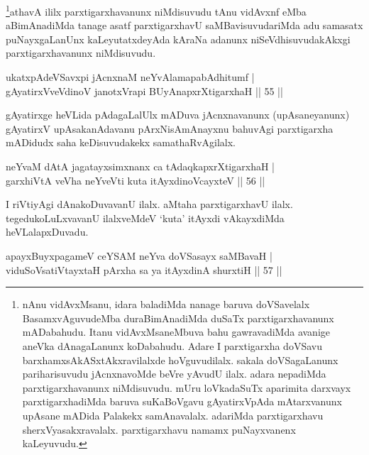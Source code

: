 \begin{artha} 
\footnote[1]{nAnu vidAvxMsanu, idara baladiMda nanage baruva 
doVSavelalx BasamxvAguvudeMba duraBimAnadiMda duSaTx 
parxtigarxhavanunx mADabahudu. Itanu vidAvxMsaneMbuva bahu 
gawravadiMda avanige aneVka dAnagaLanunx koDabahudu. Adare I 
parxtigarxha doVSavu barxhamxsAkASxtAkxravilalxde hoVguvudilalx. 
sakala doVSagaLanunx pariharisuvudu jAcnxnavoMde beVre yAvudU ilalx. 
adara nepadiMda parxtigarxhavanunx niMdisuvudu. mUru loVkadaSuTx 
aparimita darxvayx parxtigarxhadiMda baruva suKaBoVgavu gAyatirxVpAda 
mAtarxvanunx upAsane mADida Palakekx samAnavalalx. adariMda 
parxtigarxhavu sherxVyasakxravalalx. parxtigarxhavu namamx 
puNayxvanenx kaLeyuvudu.}athavA ililx parxtigarxhavanunx niMdisuvudu tAnu 
vidAvxnf eMba aBimAnadiMda tanage asatf parxtigarxhavU 
saMBavisuvudariMda adu samasatx puNayxgaLanUnx kaLeyutatxdeyAda kAraNa 
adanunx niSeVdhisuvudakAkxgi parxtigarxhavanunx niMdisuvudu.
\end{artha}

\begin{shl}
ukatxpAdeVSavxpi jAcnxnaM neYvAlamapabAdhitumf | \\
gAyatirxVveVdinoV janotxVrapi BUyAnapxrXtigarxhaH \hfill ||  55 || 
\end{shl}

\begin{artha} 
gAyatirxge heVLida pAdagaLalUlx mADuva jAcnxnavanunx (upAsaneyanunx) 
gAyatirxV upAsakanAdavanu pArxNisAmAnayxnu bahuvAgi parxtigarxha 
mADidudx saha keDisuvudakekx samathaRvAgilalx.
\end{artha}


\begin{shl}
neYvaM dAtA jagatayxsimxnanx ca tAdaqkapxrXtigarxhaH | \\
garxhiVtA veVha neYveVti kuta itAyxdinoVcayxteV \hfill ||  56 ||
\end{shl}

\begin{artha} 
I riVtiyAgi dAnakoDuvavanU ilalx. aMtaha parxtigarxhavU ilalx. 
tegedukoLuLxvavanU ilalxveMdeV `kuta' itAyxdi vAkayxdiMda 
heVLalapxDuvadu.
\end{artha}


\begin{shl}
apayxBuyxpagameV ceYSAM neYva doVSasayx saMBavaH | \\
viduSoV\s satiVtayxtaH pArxha sa ya itAyxdinA shurxtiH \hfill ||  57 || 
\end{shl}

